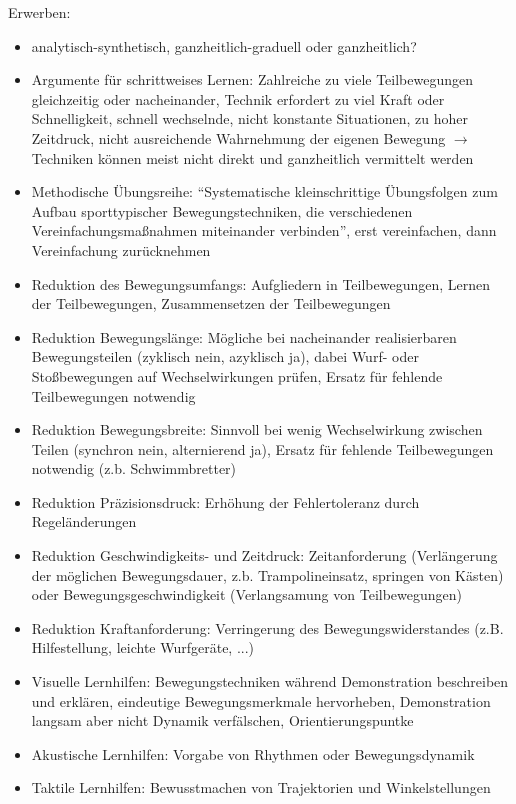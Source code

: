 Erwerben:
\begin{itemize}
    \item analytisch-synthetisch, ganzheitlich-graduell oder ganzheitlich?
    \item Argumente für schrittweises Lernen: Zahlreiche zu viele Teilbewegungen gleichzeitig oder nacheinander, Technik erfordert zu viel Kraft oder Schnelligkeit, schnell wechselnde, nicht konstante Situationen, zu hoher Zeitdruck, nicht ausreichende Wahrnehmung der eigenen Bewegung $\rightarrow$ Techniken können meist nicht direkt und ganzheitlich vermittelt werden
    \item Methodische Übungsreihe: ``Systematische kleinschrittige Übungsfolgen zum Aufbau sporttypischer Bewegungstechniken, die verschiedenen Vereinfachungsmaßnahmen miteinander verbinden'', erst vereinfachen, dann Vereinfachung zurücknehmen
    \item Reduktion des Bewegungsumfangs: Aufgliedern in Teilbewegungen, Lernen der Teilbewegungen, Zusammensetzen der Teilbewegungen
    \item Reduktion Bewegungslänge: Mögliche bei nacheinander realisierbaren Bewegungsteilen (zyklisch nein, azyklisch ja), dabei Wurf- oder Stoßbewegungen auf Wechselwirkungen prüfen, Ersatz für fehlende Teilbewegungen notwendig
    \item Reduktion Bewegungsbreite: Sinnvoll bei wenig Wechselwirkung zwischen Teilen (synchron nein, alternierend ja), Ersatz für fehlende Teilbewegungen notwendig (z.b. Schwimmbretter)
    \item Reduktion Präzisionsdruck: Erhöhung der Fehlertoleranz durch Regeländerungen
    \item Reduktion Geschwindigkeits- und Zeitdruck: Zeitanforderung (Verlängerung der möglichen Bewegungsdauer, z.b. Trampolineinsatz, springen von Kästen) oder Bewegungsgeschwindigkeit (Verlangsamung von Teilbewegungen)
    \item Reduktion Kraftanforderung: Verringerung des Bewegungswiderstandes (z.B. Hilfestellung, leichte Wurfgeräte, ...)
    \item Visuelle Lernhilfen: Bewegungstechniken während Demonstration beschreiben und erklären, eindeutige Bewegungsmerkmale hervorheben, Demonstration langsam aber nicht Dynamik verfälschen, Orientierungspuntke
    \item Akustische Lernhilfen: Vorgabe von Rhythmen oder Bewegungsdynamik
    \item Taktile Lernhilfen: Bewusstmachen von Trajektorien und Winkelstellungen
\end{itemize}

